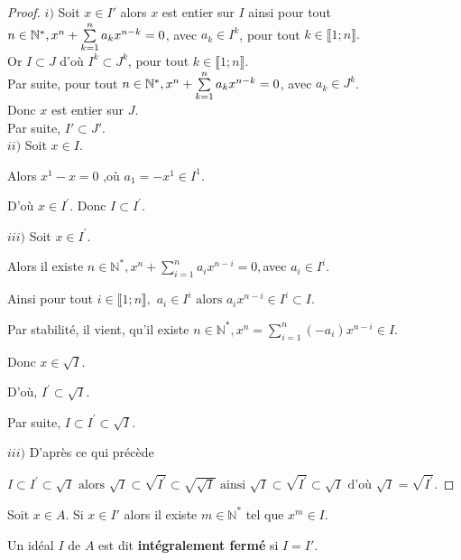 \begin{proof}
	$i)$ Soit $x \in I'$ alors $x$ est entier sur $I$ ainsi pour tout $n \in \mathbb{N}^*,\\ x^n + \sum\limits_{k=1}^{n} a_k x^{n-k}=0$, avec $a_k \in I^k$, pour tout $k \in \llbracket 1; n \rrbracket.$\\ 
	Or $I \subset J$ d'où $I^k \subset J^k$, pour tout $k \in \llbracket 1; n \rrbracket$.\\
	Par suite, pour tout $n \in \mathbb{N}^*,\\ x^n + \sum\limits_{k=1}^{n} a_k x^{n-k}=0$, avec $a_k \in J^k$.\\
	Donc $x$ est entier sur $J$.\\ Par suite, $I' \subset J'$.\\
	$ii)$ Soit $x\in I.$
	
	Alors $x^{1}-x=0$ ,où $a_{1}=-x^{1}\in I^{1}.$
	
	D'où $x\in I^{\prime }.$ Donc $I\subset I^{\prime }.$
	
	$iii)$ Soit $x\in I^{\prime }.$
	
	Alors il existe $n\in \mathbb{N}^{\ast },x^{n}+\sum\limits_{i=1}^{n}a_{i}x^{n-i}=0,$avec $a_{i}\in I^{i}.$
	
	Ainsi pour tout $i\in \llbracket 1; n \rrbracket,$ $a_{i}\in I^{i}\text{ alors }
	a_{i}x^{n-i}\in I^{i}\subset I.$
	
	Par stabilité, il vient, qu'il existe $n\in \mathbb{N}^{\ast },x^{n}=\sum\limits_{i=1}^{n}(-a_{i})x^{n-i}\in I.$
	
	Donc $x\in \sqrt{I}.$
	
	D'où, $I^{\prime }\subset \sqrt{I}.$
	
	Par suite, $I\subset I^{\prime }\subset \sqrt{I}.$
	
	$iii)$ D'après ce qui précède
	
	$I\subset I^{\prime }\subset \sqrt{I}\text{ alors } \sqrt{I}\subset \sqrt{I^{\prime }}\subset \sqrt{\sqrt{I}}\text{ ainsi } \sqrt{I}\subset \sqrt{I^{\prime }}\subset \sqrt{I}\text{ d'où } \sqrt{I}=\sqrt{I^{\prime }}.$
\end{proof}
\begin{maconsequence}
	Soit $x \in A$.
	Si $x \in I'$ alors il existe $m \in \mathbb{N^*}$ tel que $x^m \in I$.
\end{maconsequence}
\begin{madefinition}
	Un idéal $I$ de $A$ est dit \textbf{intégralement fermé} si $I = I'$.
\end{madefinition}

